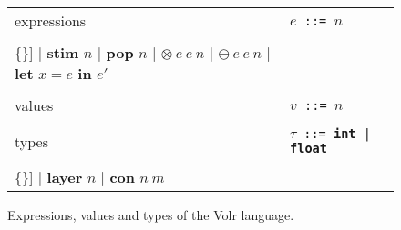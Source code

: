 \begin{figure}
  \begin{tabular}[t]{l l}
    expressions 
    & \texttt{$e$ ::= $n$} \\
    & \begin{minipage}{0.6\textwidth}
      \begin{Verbatim}[mathescape,commandchars=\\\{\}]
    | \textbf{stim} $n$
    | \textbf{pop} $n$
    | $\otimes\ e\ e\ n$
    | $\ominus\ e\ e\ n$
    | \textbf{let} $x = e$ \textbf{in} $e'$
      \end{Verbatim} 
    \end{minipage} \\

    & \\ %
    
    values
    & \texttt{$v$ ::= $n$} \\
    
    & \\ %

    types
    & \texttt{$\tau$ ::= \textbf{int} | \textbf{float}} \\
    & \begin{minipage}{0.6\textwidth}
      \begin{Verbatim}[mathescape,commandchars=\\\{\}]
    | \textbf{layer} $n$
    | \textbf{con} $n\ m$
      \end{Verbatim}
    \end{minipage}
  \end{tabular}

  \caption{Expressions, values and types of the Volr language.}
  \label{fig:volr-expr}
\end{figure}
